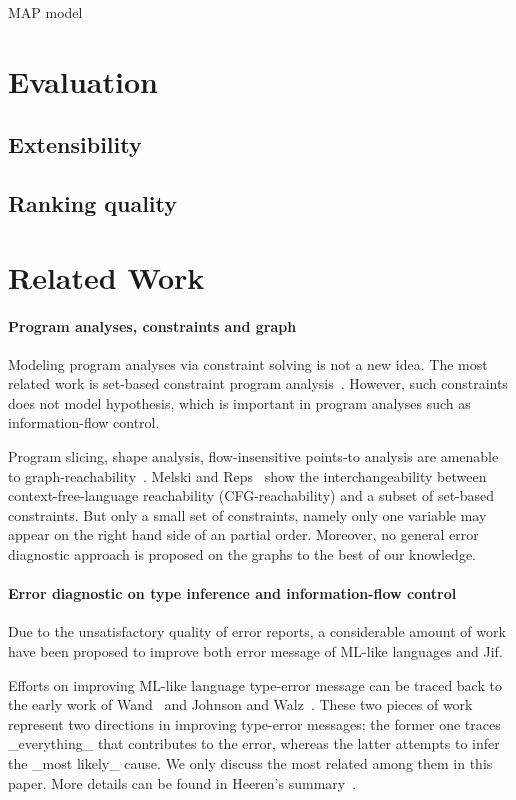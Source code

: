 MAP model

\section{Evaluation}

\subsection{Extensibility}

\subsection{Ranking quality}

\section{Related Work}

\paragraph{Program analyses, constraints and graph} 

Modeling program analyses via constraint solving is not a new idea. The most
related work is set-based constraint program
analysis~\cite{aiken-setconstraint, aiken-typeinclusion}.  However, such
constraints does not model hypothesis, which is important in program analyses
such as information-flow control.
 
Program slicing, shape analysis, flow-insensitive points-to analysis are
amenable to graph-reachability~\cite{reps-graph}. Melski and
Reps~\cite{melski-cflgraph} show the interchangeability between
context-free-language reachability (CFG-reachability) and a subset of
set-based constraints. But only a small set of constraints, namely
only one variable may appear on the right hand side of an partial
order. Moreover, no general error diagnostic approach is proposed on
the graphs to the best of our knowledge. 

\paragraph{Error diagnostic on type inference and information-flow
control} 

Due to the unsatisfactory quality of error reports, a considerable
amount of work have been proposed to improve both error message of
ML-like languages and Jif.

Efforts on improving ML-like language type-error message can be traced back to
the early work of Wand~\cite{wand-errorfinding} and Johnson and
Walz~\cite{johnson-popl86}. These two pieces of work represent two directions
in improving type-error messages: the former one traces _everything_ that
contributes to the error, whereas the latter attempts to infer the _most
likely_ cause. We only discuss the most related among them in this paper. More
details can be found in Heeren's summary~\cite{heeren:thesis}.

